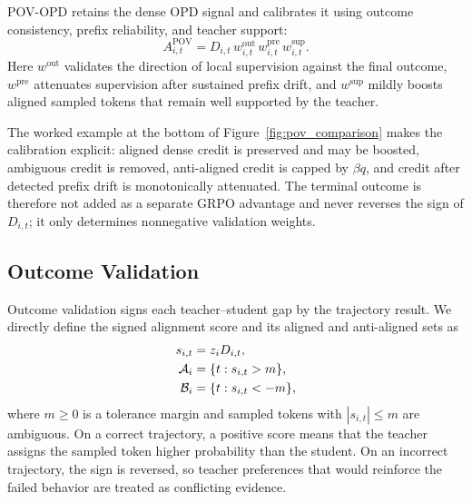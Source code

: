 POV-OPD retains the dense OPD signal and calibrates it using outcome consistency, prefix reliability, and teacher support:
\begin{equation}
A^{\mathrm{POV}}_{i,t}
=D_{i,t}\,
w^{\mathrm{out}}_{i,t}\,
w^{\mathrm{pre}}_{i,t}\,
w^{\mathrm{sup}}_{i,t}.
\label{eq:pov-advantage}
\end{equation}
Here $w^{\mathrm{out}}$ validates the direction of local supervision against the final outcome, $w^{\mathrm{pre}}$ attenuates supervision after sustained prefix drift, and $w^{\mathrm{sup}}$ mildly boosts aligned sampled tokens that remain well supported by the teacher.



The worked example at the bottom of Figure~\ref{fig:pov_comparison} makes the calibration explicit: aligned dense credit is preserved and may be boosted, ambiguous credit is removed, anti-aligned credit is capped by $\beta q$, and credit after detected prefix drift is monotonically attenuated. The terminal outcome is therefore not added as a separate GRPO advantage and never reverses the sign of $D_{i,t}$; it only determines nonnegative validation weights.

\subsection{Outcome Validation}

Outcome validation signs each teacher--student gap by the trajectory result. We directly define the signed alignment score and its aligned and anti-aligned sets as
\begin{equation}
\begin{aligned}
s_{i,t}&=z_iD_{i,t},\\
{\cal A}_i&=\{t:s_{i,t}>m\},\\
{\cal B}_i&=\{t:s_{i,t}<-m\},
\end{aligned}
\label{eq:outcome-sets}
\end{equation}
where $m\geq0$ is a tolerance margin and sampled tokens with $|s_{i,t}|\leq m$ are ambiguous. On a correct trajectory, a positive score means that the teacher assigns the sampled token higher probability than the student. On an incorrect trajectory, the sign is reversed, so teacher preferences that would reinforce the failed behavior are treated as conflicting evidence.

